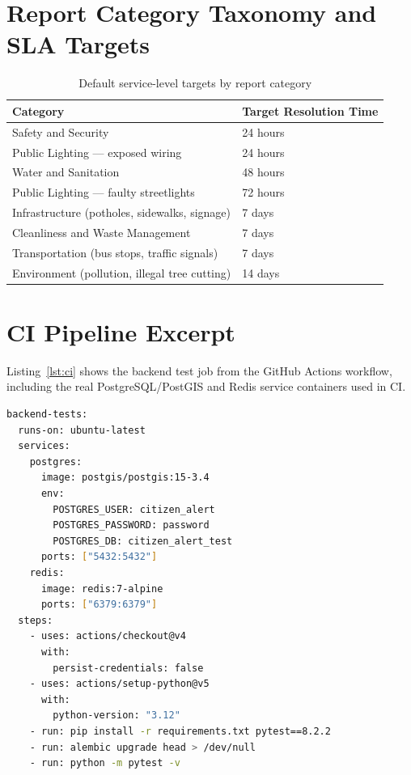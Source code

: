 \chapter{Report Category Taxonomy and SLA Targets}

\begin{table}[h!]
\centering
\begin{tabularx}{\textwidth}{Xl}
\toprule
\textbf{Category} & \textbf{Target Resolution Time} \\
\midrule
Safety and Security                          & 24 hours \\
Public Lighting --- exposed wiring           & 24 hours \\
Water and Sanitation                         & 48 hours \\
Public Lighting --- faulty streetlights      & 72 hours \\
Infrastructure (potholes, sidewalks, signage) & 7 days \\
Cleanliness and Waste Management             & 7 days \\
Transportation (bus stops, traffic signals)  & 7 days \\
Environment (pollution, illegal tree cutting) & 14 days \\
\bottomrule
\end{tabularx}
\caption{Default service-level targets by report category}
\end{table}

\chapter{CI Pipeline Excerpt}

Listing~\ref{lst:ci} shows the backend test job from the GitHub Actions workflow, including the real PostgreSQL/PostGIS and Redis service containers used in CI.

\begin{lstlisting}[language=bash, caption={Backend test job (excerpt), \texttt{.github/workflows/ci.yml}}, label={lst:ci}]
backend-tests:
  runs-on: ubuntu-latest
  services:
    postgres:
      image: postgis/postgis:15-3.4
      env:
        POSTGRES_USER: citizen_alert
        POSTGRES_PASSWORD: password
        POSTGRES_DB: citizen_alert_test
      ports: ["5432:5432"]
    redis:
      image: redis:7-alpine
      ports: ["6379:6379"]
  steps:
    - uses: actions/checkout@v4
      with:
        persist-credentials: false
    - uses: actions/setup-python@v5
      with:
        python-version: "3.12"
    - run: pip install -r requirements.txt pytest==8.2.2
    - run: alembic upgrade head > /dev/null
    - run: python -m pytest -v
\end{lstlisting}

